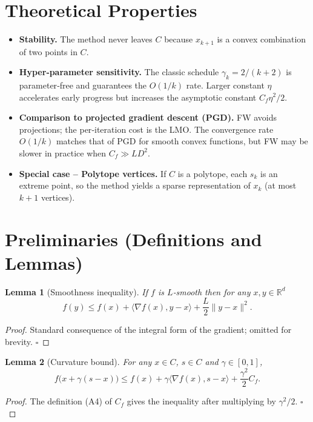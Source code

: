 \documentclass{article}
\newtheorem{lemma}{Lemma}
\newcommand{\R}{\mathbb{R}}
\begin{document}
\section*{Theoretical Properties}
\begin{itemize}
\item \textbf{Stability.} The method never leaves $C$ because $x_{k+1}$ is a convex combination of two points in $C$.
\item \textbf{Hyper‑parameter sensitivity.} The classic schedule $\gamma_k=2/(k+2)$ is parameter‑free and guarantees the $O(1/k)$ rate. Larger constant $\eta$ accelerates early progress but increases the asymptotic constant $C_f\eta^{2}/2$.
\item \textbf{Comparison to projected gradient descent (PGD).} FW avoids projections; the per‑iteration cost is the LMO. The convergence rate $O(1/k)$ matches that of PGD for smooth convex functions, but FW may be slower in practice when $C_f\gg L D^{2}$.
\item \textbf{Special case – Polytope vertices.} If $C$ is a polytope, each $s_k$ is an extreme point, so the method yields a sparse representation of $x_k$ (at most $k+1$ vertices).
\end{itemize}

\section*{Preliminaries (Definitions and Lemmas)}
\begin{lemma}[Smoothness inequality]\label{lem:smooth}
If $f$ is $L$‑smooth then for any $x,y\in\R^{d}$
\[
f(y) \le f(x) + \langle \nabla f(x),y-x\rangle + \frac{L}{2}\|y-x\|^{2}.
\tag{L1}
\]
\end{lemma}
\begin{proof}
Standard consequence of the integral form of the gradient; omitted for brevity. \hfill $\square$
\end{proof}

\begin{lemma}[Curvature bound]\label{lem:curv}
For any $x\in C$, $s\in C$ and $\gamma\in[0,1]$,
\[
f\bigl(x+\gamma(s-x)\bigr)
\le f(x) + \gamma\langle\nabla f(x),s-x\rangle + \frac{\gamma^{2}}{2}C_f .
\tag{L2}
\]
\end{lemma}
\begin{proof}
The definition (A4) of $C_f$ gives the inequality after multiplying by $\gamma^{2}/2$. \hfill $\square$
\end{proof}
\end{document}
